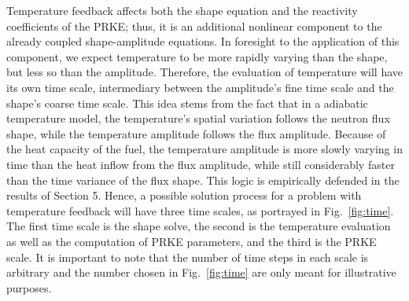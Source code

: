 \documentclass{elsarticle}
\newcommand{\fig}[1]{Fig.~\ref{#1}}                      %
\begin{document}
Temperature feedback affects both the shape equation and the reactivity coefficients of the PRKE; thus, 
it is an additional nonlinear component to the already coupled shape-amplitude equations. In foresight to 
the application of this component, we expect temperature to be more rapidly varying than the shape, but 
less so than the amplitude.  Therefore, the evaluation of temperature will have its own time scale, intermediary
between the amplitude's fine time scale and the shape's coarse time scale. 
This idea stems from the fact that in a adiabatic temperature model, the temperature's spatial variation follows the neutron flux shape, while the temperature amplitude follows the flux amplitude. Because of the heat capacity of the fuel, the temperature amplitude is more slowly varying in time than the heat inflow from the flux amplitude, while still considerably faster than the time variance of the flux shape. This logic is empirically defended in the results of Section 5.
Hence, a possible solution process for a problem with temperature feedback will have three time scales, as
portrayed in \fig{fig:time}.  The first time scale is the shape solve, the second is the temperature evaluation 
as well as the computation of PRKE parameters, and the third is the PRKE scale.  It is important to note that the 
number of time steps in each scale is arbitrary and the number chosen in \fig{fig:time} are only meant for 
illustrative purposes.
\end{document}
